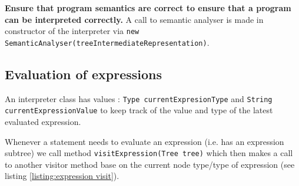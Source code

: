 \textbf{
	Ensure that program semantics are correct  to ensure that a program can be interpreted correctly.} A call to semantic analyser is made in constructor of the interpreter via \verb!new SemanticAnalyser(treeIntermediateRepresentation)!.



\subsection{Evaluation of expressions}
An interpreter class has values : \verb!Type currentExpresionType! and \verb!String currentExpressionValue! to keep track of the value and type of the latest evaluated expression.

Whenever a statement  needs to evaluate an expression (i.e. has an expression subtree) we call method \verb!visitExpression(Tree tree)! which then makes a call to another visitor method base on the current node type/type of expression (see listing \ref{listing:expression visit}).

